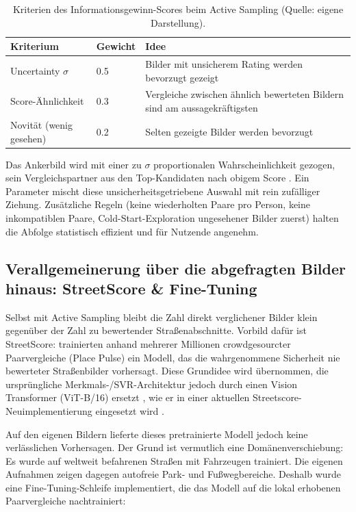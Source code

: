 \documentclass[a4paper,12pt]{article}
\begin{document}
\begin{table}[h]
	\centering
	\begin{tabularx}{\textwidth}{@{}llX@{}}
		\toprule
		Kriterium & Gewicht & Idee \\
		\midrule
		Uncertainty $\sigma$ & 0.5 & Bilder mit unsicherem Rating werden bevorzugt gezeigt \\
		Score-Ähnlichkeit & 0.3 & Vergleiche zwischen ähnlich bewerteten Bildern sind am aussagekräftigsten \\
		Novität (wenig gesehen) & 0.2 & Selten gezeigte Bilder werden bevorzugt \\
		\bottomrule
	\end{tabularx}
	\caption[Kriterien des Informationsgewinn-Scores]{Kriterien des Informationsgewinn-Scores beim Active Sampling (Quelle: eigene Darstellung).}
\end{table}

Das Ankerbild wird mit einer zu $\sigma$ proportionalen Wahrscheinlichkeit gezogen, sein Vergleichspartner aus den Top-Kandidaten nach obigem Score \autocite{settles2009}. Ein Parameter mischt diese unsicherheitsgetriebene Auswahl mit rein zufälliger Ziehung. Zusätzliche Regeln (keine wiederholten Paare pro Person, keine inkompatiblen Paare, Cold-Start-Exploration ungesehener Bilder zuerst) halten die Abfolge statistisch effizient und für Nutzende angenehm.

\subsection{Verallgemeinerung über die abgefragten Bilder hinaus: StreetScore \& Fine-Tuning}

Selbst mit Active Sampling bleibt die Zahl direkt verglichener Bilder klein gegenüber der Zahl zu bewertender Straßenabschnitte. Vorbild dafür ist StreetScore: \textcite{naik2014} trainierten anhand mehrerer Millionen crowdgesourcter Paarvergleiche (Place Pulse) ein Modell, das die wahrgenommene Sicherheit nie bewerteter Straßenbilder vorhersagt. Diese Grundidee wird übernommen, die ursprüngliche Merkmals-/SVR-Architektur jedoch durch einen Vision Transformer (ViT-B/16) ersetzt \autocite{dosovitskiy2021}, wie er in einer aktuellen Streetscore-Neuimplementierung eingesetzt wird \autocite{hou2024}.

Auf den eigenen Bildern lieferte dieses pretrainierte Modell jedoch keine verlässlichen Vorhersagen. Der Grund ist vermutlich eine Domänenverschiebung: Es wurde auf weltweit befahrenen Straßen mit Fahrzeugen trainiert. Die eigenen Aufnahmen zeigen dagegen autofreie Park- und Fußwegbereiche. Deshalb wurde eine Fine-Tuning-Schleife implementiert, die das Modell auf die lokal erhobenen Paarvergleiche nachtrainiert:
\end{document}
